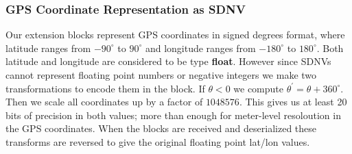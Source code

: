 \subsubsection{GPS Coordinate Representation as SDNV} \label{gps-representation}
Our extension blocks represent GPS coordinates in signed degrees format, where latitude ranges from $-90^{\circ}$ to $90^{\circ}$ and longitude ranges from $-180^{\circ}$ to $180^{\circ}$.  Both latitude and longitude are considered to be type {\bf float}.  However since SDNVs cannot represent floating point numbers or negative integers we make two transformations to encode them in the block.  If $\theta<0$ we compute $\theta^{\prime}=\theta+360^{\circ}$.  Then we scale all coordinates up by a factor of $1048576$.  This gives us at least 20 bits of precision in both values; more than enough for meter-level resoloution in the GPS coordinates.  When the blocks are received and deserialized these transforms are reversed to give the original floating point lat/lon values.




